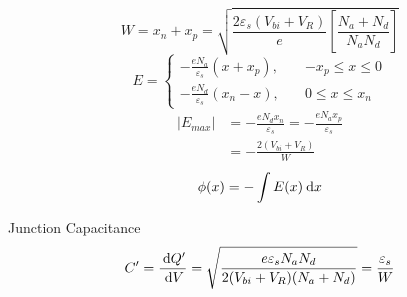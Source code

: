 \documentclass[a4paper, twocolumn]{article}
\begin{document}
            \begin{equation*}
                W = x_n + x_p = \sqrt{\frac{2 \varepsilon_s \left( V_{bi} + V_R \right)}{e}  \left[ \frac{N_a + N_d}{N_a N_d}  \right]}
            \end{equation*}
            \begin{equation*}
                E = \left\{
                    \begin{aligned}
                        - \frac{eN_a}{\varepsilon_s} (x + x_p),\quad & - x_p \le x \le 0 \\
                        - \frac{eN_d}{\varepsilon_s} (x_n - x),\quad & 0 \le x \le x_n  
                    \end{aligned}
                \right.
            \end{equation*}
            \begin{equation*}
                \begin{aligned}
                    |E_{max}| &= - \frac{eN_d x_n}{\varepsilon_s} = - \frac{e N_a x_p}{\varepsilon_s} \\ 
                    &= - \frac{2 (V_{bi} + V_R)}{W} 
                \end{aligned}
            \end{equation*}
            \begin{equation*}
                \phi(x) = - \int E(x) \: \mathrm{d} x
            \end{equation*}
    \par Junction Capacitance
    \begin{equation*}
        C^\prime = \frac{\: \mathrm{d} Q^\prime}{\: \mathrm{d} V} = \sqrt{\frac{e \varepsilon_s N_a N_d}{2 (V_{bi} + V_R) (N_a + N_d)} } = \frac{\varepsilon_s}{W}
    \end{equation*}
    
\end{document}
